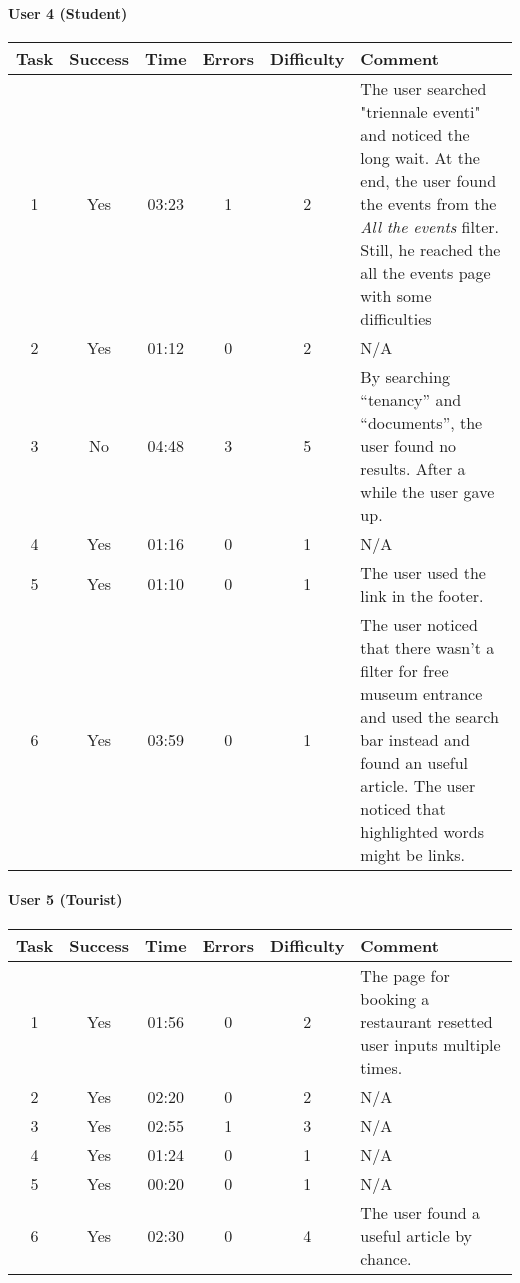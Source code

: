 \begin{small}
\paragraph{User 4 (Student)}
\begin{tabularx}{\linewidth}{c c c c c X}
    \toprule
    \textbf{Task} & \textbf{Success} & \textbf{Time}
     & \textbf{Errors} & \textbf{Difficulty} & \textbf{Comment} \\
    \midrule
    1 & Yes & 03:23 & 1 & 2 & The user searched "triennale eventi" and noticed the long wait. At the end, the user found the events from the \emph{All the events} filter. Still, he reached the all the events page with some difficulties \\ \midrule
    2 & Yes & 01:12 & 0 & 2 & N/A \\ \midrule
    3 & No & 04:48 & 3 & 5 & By searching ``tenancy'' and ``documents'', the user found no results. After a while the user gave up. \\ \midrule
    4 & Yes & 01:16 & 0 & 1 & N/A \\ \midrule
    5 & Yes & 01:10 & 0 & 1 & The user used the link in the footer. \\ \midrule
    6 & Yes & 03:59 & 0 & 1 & The user noticed that there wasn't a filter for free museum entrance and used the search bar instead and found an useful article. The user noticed that highlighted words might be links. \\ \bottomrule
\end{tabularx}

\paragraph{User 5 (Tourist)}
\begin{tabularx}{\linewidth}{c c c c c X}
    \toprule
    \textbf{Task} & \textbf{Success} & \textbf{Time}
     & \textbf{Errors} & \textbf{Difficulty} & \textbf{Comment} \\
    \midrule
    1 & Yes & 01:56 & 0 & 2 & The page for booking a restaurant resetted user inputs multiple times. \\ \midrule
    2 & Yes & 02:20 & 0 & 2 & N/A \\ \midrule
    3 & Yes & 02:55 & 1 & 3 & N/A \\ \midrule
    4 & Yes & 01:24 & 0 & 1 & N/A \\ \midrule
    5 & Yes & 00:20 & 0 & 1 & N/A \\ \midrule
    6 & Yes & 02:30 & 0 & 4 & The user found a useful article by chance. \\  \bottomrule
\end{tabularx}


\end{small}
